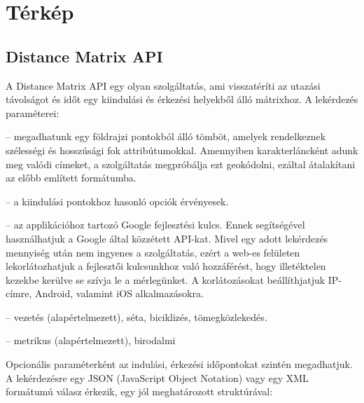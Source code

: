 \section{Térkép}\label{sec:ALAP:szerkeszt}

\subsection{Distance Matrix API}

A Distance Matrix API egy olyan szolgáltatás, ami visszatéríti az utazási távolságot és időt egy kiindulási és érkezési helyekből álló mátrixhoz. A lekérdezés paraméterei:

\begin{description}
	\setlength{\itemsep}{0.04mm}
	\item[origins (kiindulási pontok)] -- megadhatunk egy földrajzi pontokból álló tömböt, amelyek rendelkeznek szélességi és hosszúsági fok attribútumokkal. Amennyiben karakterláncként adunk meg valódi címeket, a szolgáltatás megpróbálja ezt geokódolni, ezáltal átalakítani az előbb említett formátumba.
	\item[destinations (érkezési pontok)] --  a kiindulási pontokhoz hasonló opciók érvényesek.
	\item[key (kulcs)] -- az applikációhoz tartozó Google fejlesztési kulcs. Ennek segítségével használhatjuk a Google által közzétett API-kat. Mivel egy adott lekérdezés mennyiség után nem ingyenes a szolgáltatás, ezért a web-es felületen lekorlátozhatjuk a fejlesztői kulcsunkhoz való hozzáférést, hogy illetéktelen kezekbe kerülve se szívja le a mérlegünket. A korlátozásokat beállíthjatjuk IP-címre, Android, valamint iOS alkalmazásokra.
	\item[utazási mód (opcionális)] -- vezetés (alapértelmezett), séta, biciklizés, tömegközlekedés.
	\item[mértékegység (opcionális)] -- metrikus (alapértelmezett), birodalmi
\end{description}

Opcionális paraméterként az indulási, érkezési időpontokat szintén megadhatjuk. A lekérdezésre egy JSON (JavaScript Object Notation) vagy egy XML formátumú válasz érkezik, egy jól meghatározott struktúrával:

